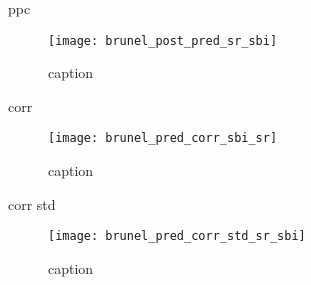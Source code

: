 ppc 

\begin{figure}[H]
    \centering
    \texttt{[image: brunel\_post\_pred\_sr\_sbi]}
    \caption{caption}
    \label{fig:fig1}
\end{figure}

corr 

\begin{figure}[H]
    \centering
    \texttt{[image: brunel\_pred\_corr\_sbi\_sr]}
    \caption{caption}
    \label{fig:fig1}
\end{figure}

corr std

\begin{figure}[H]
    \centering
    \texttt{[image: brunel\_pred\_corr\_std\_sr\_sbi]}
    \caption{caption}
    \label{fig:fig1}
\end{figure}
